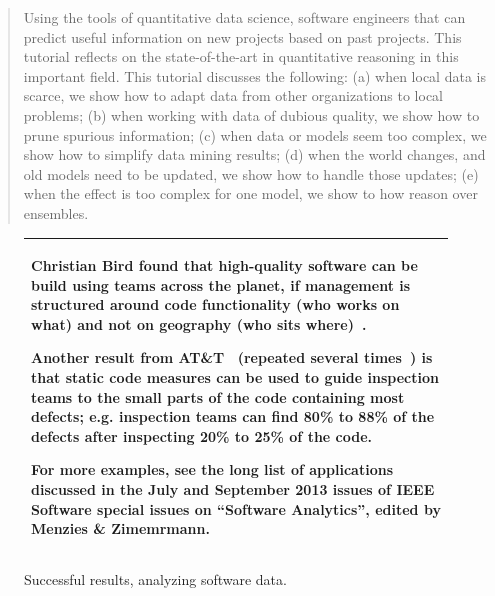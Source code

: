 \documentclass[conference]{IEEEtran}
\begin{document}
\maketitle


\begin{abstract}
Using the tools of quantitative data science, software engineers that can predict useful information on new projects based on past projects.  This tutorial reflects on the state-of-the-art in quantitative  reasoning in this important field. This  tutorial discusses the following:   (a) when local data is scarce, we show how to adapt data from other organizations to local problems; (b) when working with data of dubious quality, we show how to prune spurious information; (c) when data or models seem too complex, we show how to simplify   data mining results; (d) when the world changes, and old models need to be updated, we show how to handle those updates; (e) when the effect is too complex for one model, we show to how reason over ensembles.
\end{abstract}





%
\IEEEpeerreviewmaketitle
 
 

\begin{figure}[!b]
\begin{tabular}{|p{.95\linewidth}|}\hline
  Christian Bird found that  high-quality software can be build using teams across the planet, if management is structured around code functionality (who works on what) and not  on geography (who sits where)~\cite{bird09a}.

Another result from AT\&T~\cite{ostrand04} (repeated several times~\cite{me10a,tosun10}) is that static code measures can be used to guide inspection teams to the small parts of the code containing most defects; e.g. inspection teams can find 80\% to 88\% of the defects after inspecting 20\% to 25\% of the code. 
 
For more examples, see the long list of applications discussed in the July and September 2013 issues of IEEE Software special issues on “Software Analytics”, edited by Menzies \& Zimemrmann.
\\\hline
\end{tabular}
\caption{Successful results, analyzing software data.}
\end{figure}
\end{document}
